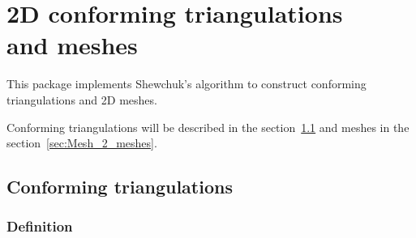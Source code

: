 \chapter{2D conforming triangulations\\ and meshes}
\label{user_chapter_2D_Meshes}

\minitoc

This package implements Shewchuk's algorithm to construct conforming
triangulations and 2D meshes.

Conforming triangulations will be described in the
section~\ref{sec:Mesh_2_conforming_triangulation} and meshes in the
section~\ref{sec:Mesh_2_meshes}.






\section{Conforming triangulations}
\label{sec:Mesh_2_conforming_triangulation}

\subsection{Definition}
\label{sec:Mesh_2_conforming_defition}

